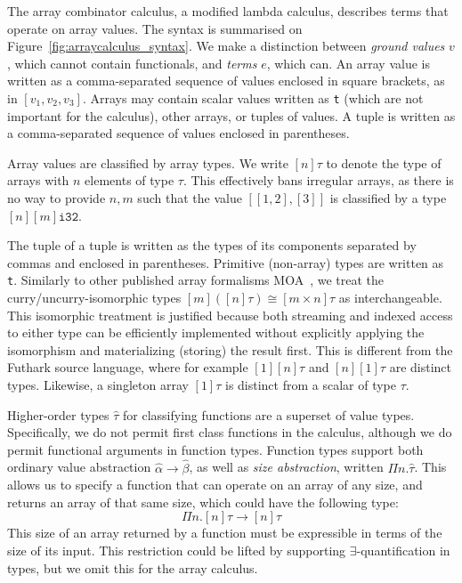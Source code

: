 The array combinator calculus, a modified lambda calculus, describes
terms that operate on array values.  The syntax is summarised on
Figure~\ref{fig:arraycalculus_syntax}.  We make a distinction between
\textit{ground values}
$v$, which cannot contain functionals, and \textit{terms}
$e$, which can.  An array value is written as a comma-separated
sequence of values enclosed in square brackets, as in $[v_{1}, v_{2},
v_{3}]$.  Arrays may contain scalar values written as \texttt{t}
(which are not important for the calculus), other arrays, or tuples of
values.  A tuple is written as a comma-separated sequence of values
enclosed in parentheses.

Array values are classified by array types.  We write $[n]\tau$ to
denote the type of arrays with $n$ elements of type $\tau$.  This
effectively bans irregular arrays, as there is no way to provide $n,m$
such that the value $[[1,2],[3]]$ is classified by a type
$[n][m]\texttt{i32}$.

The tuple of a tuple is written as the types of its components
separated by commas and enclosed in parentheses.  Primitive
(non-array) types are written as \texttt{t}.  Similarly to other
published array formalisms MOA~\cite{moa}, we treat the
curry/uncurry-isomorphic types $[m]([n]\tau) \cong [m \times n]\tau$
as interchangeable.  This isomorphic treatment is justified because
both streaming and indexed access to either type can be efficiently
implemented without explicitly applying the isomorphism and
materializing (storing) the result first.  This is different from the
Futhark source language, where for example $[1][n]\tau$ and
$[n][1]\tau$ are distinct types.  Likewise, a singleton array
$[1]\tau$ is distinct from a scalar of type $\tau$.

Higher-order types $\hat{\tau}$ for classifying functions are a
superset of value types.  Specifically, we do not permit first class
functions in the calculus, although we do permit functional arguments
in function types.  Function types support both ordinary value
abstraction $\hat\alpha\rightarrow\hat\beta$, as well as \textit{size
  abstraction}, written $\Pi n.\hat\tau$.  This allows us to specify a
function that can operate on an array of any size, and returns an
array of that same size, which could have the following type:
\[
  \Pi n.[n]\tau\rightarrow[n]\tau
\]
This size of an array returned by a function must be expressible in
terms of the size of its input.  This restriction could be lifted by
supporting $\exists$-quantification in types, but we omit this for the
array calculus.

